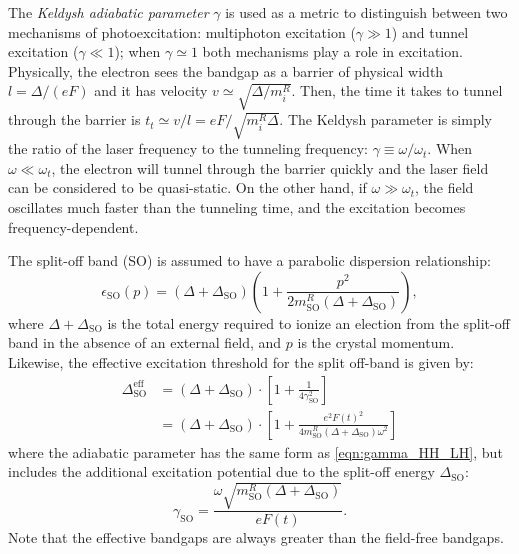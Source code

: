 The \textit{Keldysh adiabatic parameter} $\gamma$ is used as a metric to distinguish between two mechanisms of photoexcitation: multiphoton excitation ($\gamma \gg 1$) and tunnel excitation ($\gamma \ll 1$); when $\gamma \simeq 1$ both mechanisms play a role in excitation. Physically, the electron sees the bandgap as a barrier of physical width $l = \Delta / (e F)$ and it has velocity $v \simeq \sqrt{\Delta / m_i^R}$. Then, the time it takes to tunnel through the barrier is $t_t \simeq v/l = eF / \sqrt{m_i^R \Delta}$. The Keldysh parameter is simply the ratio of the laser frequency to the tunneling frequency: $\gamma \equiv \omega / \omega_t$. When $\omega \ll \omega_t$, the electron will tunnel through the barrier quickly and the laser field can be considered to be quasi-static. On the other hand, if $\omega \gg \omega_t$, the field oscillates much faster than the tunneling time, and the excitation becomes frequency-dependent.

The split-off band (SO) is assumed to have a parabolic dispersion relationship:
\begin{equation}
	\epsilon_{\textrm{SO}}(p) = (\Delta+\Delta_{\textrm{SO}}) \left( 1 + \frac{p^2}{2 m_{\textrm{SO}}^R (\Delta+\Delta_{\textrm{SO}})}  \right),
\end{equation}
where $\Delta + \Delta_{\textrm{SO}}$ is the total energy required to ionize an election from the split-off band in the absence of an external field, and $p$ is the crystal momentum. Likewise, the effective excitation threshold for the split off-band is given by:
\begin{equation}
	\begin{aligned}
		\Delta_{\textrm{SO}}^{\textrm{eff}} &= (\Delta + \Delta_{\textrm{SO}}) \cdot \left[ 1 + \frac{1}{4 \gamma^2_{\textrm{SO}}} \right] \\
		&= (\Delta + \Delta_{\textrm{SO}}) \cdot \left[1 + \frac{e^2 F(t)^2}{4 m_{\textrm{SO}}^R (\Delta + \Delta_{\textrm{SO}}) \omega^2} \right]
	\end{aligned}
	\label{eqn:eff_bandgap_SO}
\end{equation}
where the adiabatic parameter has the same form as \cref{eqn:gamma_HH_LH}, but includes the additional excitation potential due to the split-off energy $\Delta_{\textrm{SO}}$:
\begin{equation}
	\label{eqn:gamma_SO}
	\gamma_{\textrm{SO}} = \frac{\omega \sqrt{m_{\textrm{SO}}^R (\Delta + \Delta_{\textrm{SO}})}}{e F(t)}.
\end{equation}
Note that the effective bandgaps are always greater than the field-free bandgaps.

